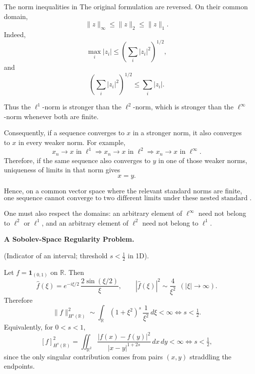 \begin{solution}
The norm inequalities in The original formulation are reversed. On their common domain,
\[
\boxed{
\|z\|_\infty
\le
\|z\|_2
\le
\|z\|_1.
}
\]
Indeed,
\[
\max_i|z_i|
\le
\left(\sum_i|z_i|^2\right)^{1/2},
\]
and
\[
\left(\sum_i|z_i|^2\right)^{1/2}
\le
\sum_i|z_i|.
\]

Thus the \(\ell^1\)-norm is stronger than the \(\ell^2\)-norm, which is stronger than the
\(\ell^\infty\)-norm whenever both are finite.

Consequently, if a sequence converges to \(x\) in a stronger norm, it also converges to \(x\)
in every weaker norm. For example,
\[
x_n\to x\text{ in }\ell^1
\Longrightarrow
x_n\to x\text{ in }\ell^2
\Longrightarrow
x_n\to x\text{ in }\ell^\infty.
\]
Therefore, if the same sequence also converges to \(y\) in one of those weaker norms,
uniqueness of limits in that norm gives
\[
x=y.
\]

Hence, on a common vector space where the relevant standard norms are finite,
\[
\boxed{
\text{one sequence cannot converge to two different limits under these nested standard norms}.
}
\]

One must also respect the domains: an arbitrary element of \(\ell^\infty\) need not belong
to \(\ell^2\) or \(\ell^1\), and an arbitrary element of \(\ell^2\) need not belong to
\(\ell^1\).
\end{solution}


\begin{problem}[CP-II-0521]
\label{prob:cp-ii-0521}
\textbf{A Sobolev-Space Regularity Problem.}

\hspace*{1.5em}(Indicator of an interval; threshold $s<\tfrac12$ in 1D).

Let $f=\mathbf 1_{(0,1)}$ on $\mathbb R$. Then
\[
\widehat f(\xi)=e^{-i\xi/2}\,\frac{2\sin(\xi/2)}{\xi},\qquad
|\widehat f(\xi)|^2\sim \frac{4}{\xi^2}\ \ (|\xi|\to\infty).
\]
Therefore
\[
\|f\|_{H^s(\mathbb R)}^2\sim \int_{\mathbb R}(1+\xi^2)^s\,\frac{1}{\xi^2}\,d\xi<\infty
\iff s<\tfrac12.
\]
Equivalently, for $0<s<1$,
\[
[f]_{H^s(\mathbb R)}^2
=\iint_{\mathbb R^2}\frac{|f(x)-f(y)|^2}{|x-y|^{1+2s}}\,dx\,dy<\infty
\iff s<\tfrac12,
\]
since the only singular contribution comes from pairs $(x,y)$ straddling the endpoints.

\bigskip
\end{problem}

